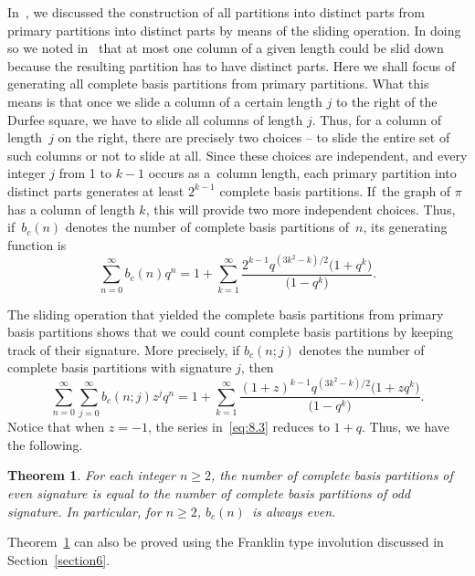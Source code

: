 \documentclass[10pt,a4paper]{amsart}
\numberwithin{equation}{section}
\newtheorem{Theorem}{Theorem}[section]
\theoremstyle{definition}
\begin{document}
In~\cite{Al0097}, we discussed the construction of all partitions into distinct parts
from primary partitions into distinct parts by means of the sliding operation.
In doing so we noted in~\cite{Al0097} that at most one column of a given length could be
slid down because the resulting partition has to have distinct parts.
Here we shall focus of generating all complete basis partitions from primary
partitions. What this means is that once we slide a column of a certain length
$j$ to the right of the Durfee square, we have to slide all columns of length
$j$. Thus, for a column of length~$j$ on the right, there are precisely two
choices -- to slide the entire set of such columns or not to slide at all. Since
these choices are independent, and every integer $j$ from 1 to $k-1$ occurs as
a~column length, each primary partition into distinct parts generates at least
$2^{k-1}$ complete basis partitions. If~the graph of $\pi$ has a column of
length $k$, this will provide two more independent choices. Thus, if~$b_c(n)$
denotes the number of complete basis partitions of~$n$, its generating
function is
\begin{equation}
\sum^{\infty}_{n=0}b_c(n)q^n=
1+\sum^{\infty}_{k=1}\frac{2^{k-1}q^{(3k^2-k)/2}\bigl(1+q^k\bigr)}{\bigl(1-q^k\bigr)}.\label{eq:8.2}
\end{equation}

The sliding operation that yielded the complete basis partitions from primary
basis partitions shows that we could count complete basis partitions
by keeping track of their signature. More precisely, if $b_c(n;j)$ denotes
the number of complete basis partitions with signature $j$, then
\begin{equation}
\sum^{\infty}_{n=0}\sum^{\infty}_{j=0}b_c(n;j)z^jq^n=
1+\sum^{\infty}_{k=1}\frac{(1+z)^{k-1}q^{(3k^2-k)/2}\bigl(1+zq^k\bigr)}{\bigl(1-q^k\bigr)}.\label{eq:8.3}
\end{equation}
Notice that when $z=-1$, the series in~\eqref{eq:8.3} reduces to $1+q$. Thus, we have the following.

\begin{Theorem}\label{thm:7}
For each integer $n\ge 2$, the number of
complete basis partitions of even signature is equal to the number of
complete basis partitions of odd signature. In particular, for $n\ge 2$, $b_c(n)$~is always even.
\end{Theorem}

Theorem~\ref{thm:7} can also be proved using the Franklin type involution discussed in
Section~\ref{section6}.
\end{document}
